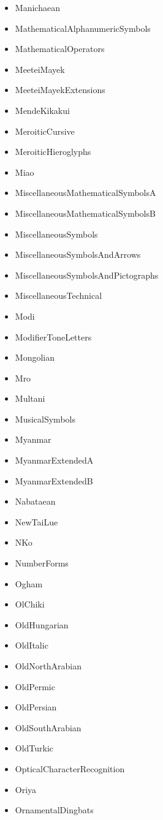 ﻿\documentclass{article}
\newenvironment{itemlist}{%
  \begin{itemize}
	\setlength{\itemsep}{0pt}
	\setlength{\parsep}{0pt}
	\setlength{\topsep}{0pt}
	\setlength{\partopsep}{0pt}
	\setlength{\parskip}{0pt}
	\setlength{\labelsep}{5pt}}%
{
  \end{itemize}}
\begin{document}
\begin{multicols}{2}
\begin{itemlist}
				\item Manichaean
				\item MathematicalAlphanumericSymbols
				\item MathematicalOperators
				\item MeeteiMayek
				\item MeeteiMayekExtensions
				\item MendeKikakui
				\item MeroiticCursive
				\item MeroiticHieroglyphs
				\item Miao
				\item MiscellaneousMathematicalSymbolsA
				\item MiscellaneousMathematicalSymbolsB
				\item MiscellaneousSymbols
				\item MiscellaneousSymbolsAndArrows
				\item MiscellaneousSymbolsAndPictographs
				\item MiscellaneousTechnical
				\item Modi
				\item ModifierToneLetters
				\item Mongolian
				\item Mro
				\item Multani
				\item MusicalSymbols
				\item Myanmar
				\item MyanmarExtendedA
				\item MyanmarExtendedB
				\item Nabataean
				\item NewTaiLue
				\item NKo
				\item NumberForms
				\item Ogham
				\item OlChiki
				\item OldHungarian
				\item OldItalic
				\item OldNorthArabian
				\item OldPermic
				\item OldPersian
				\item OldSouthArabian
				\item OldTurkic
				\item OpticalCharacterRecognition
				\item Oriya
				\item OrnamentalDingbats

\end{itemlist}
\end{multicols}
\end{document}
